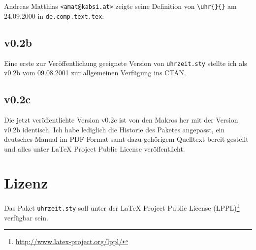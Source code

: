 \documentclass{scrartcl}
\begin{document}
Andreas Matthias \verb|<amat@kabsi.at>| zeigte seine Definition von
\verb|\uhr{}{}| am 24.09.2000 in \verb|de.comp.text.tex|.

\subsection{v0.2b}
Eine erste zur Veröffentlichung geeignete Version von
\verb|uhrzeit.sty| stellte ich als v0.2b vom 09.08.2001 zur
allgemeinen Verfügung ins CTAN.

\subsection{v0.2c}
Die jetzt veröffentlichte Version v0.2c ist von den Makros her
mit der Version v0.2b identisch. Ich habe lediglich die Historie
des Paketes angepasst, ein deutsches Manual im PDF-Format samt
dazu gehörigem Quelltext bereit gestellt und alles unter LaTeX
Project Public License veröffentlicht.

\section{Lizenz}

Das Paket \verb|uhrzeit.sty| soll unter der LaTeX Project Public
License (LPPL)\footnote{\url{http://www.latex-project.org/lppl/}}
verfügbar sein.
\end{document}
